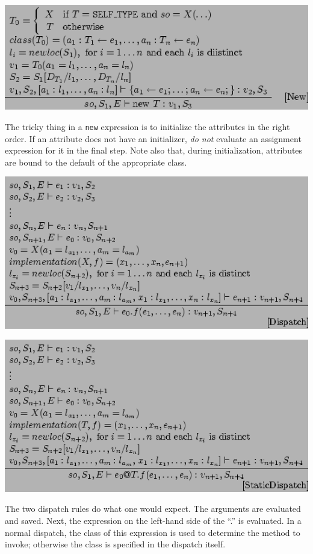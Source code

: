 \documentclass[]{article}
\begin{document}
\includegraphics{img165.png}

The tricky thing in a \texttt{new} expression is to initialize the
attributes in the right order. If an attribute does not have an
initializer, \emph{do not} evaluate an assignment expression for it in
the final step. Note also that, during initialization, attributes are
bound to the default of the appropriate class.

\includegraphics{img166.png}

\includegraphics{img167.png}

The two dispatch rules do what one would expect. The arguments are
evaluated and saved. Next, the expression on the left-hand side of the
``.'' is evaluated. In a normal dispatch, the class of this expression
is used to determine the method to invoke; otherwise the class is
specified in the dispatch itself.
\end{document}
